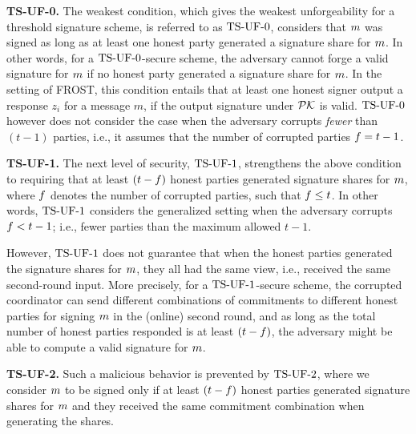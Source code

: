 
\medskip

\textbf{TS-UF-0.} The weakest condition,
which gives the weakest unforgeability for a threshold signature scheme,
is referred to as $\mathrm{TS}\mbox{-}\mathrm{UF}\mbox{-}{0}$, considers that $m$ was signed as long as at least one honest party generated a signature share for $m$.
In other words, for a $\mathrm{TS}\mbox{-}\mathrm{UF}\mbox{-}{0}$-secure scheme, the adversary cannot forge a valid signature for $m$ if no honest party generated a signature share for $m$.
In the setting of FROST,
this condition entails that at least one honest signer output a response $z_i$ for a message $m$,
if the output signature under $\mathcal{PK}$ is valid.
$\mathrm{TS}\mbox{-}\mathrm{UF}\mbox{-}{0}$ however does not consider the case when the adversary corrupts \emph{fewer} than $(t-1)$ parties,
i.e., it assumes that the number of corrupted parties $f = t-1$.

\medskip

\textbf{TS-UF-1.} The next level of security, $\mathrm{TS}\mbox{-}\mathrm{UF}\mbox{-}{1}$, strengthens the above condition to requiring that at least  $(t - f)$ honest parties generated signature shares for $m$,
where $f$ denotes the number of corrupted parties,
such that $f \leq t$.
In other words,
$\mathrm{TS}\mbox{-}\mathrm{UF}\mbox{-}{1}$ considers the generalized setting when the adversary corrupts $f < t-1$;
i.e., fewer parties than the maximum allowed $t-1$.

However, $\mathrm{TS}\mbox{-}\mathrm{UF}\mbox{-}{1}$ does not guarantee that when the honest parties generated the signature shares for $m$, they all had the same view, i.e., received the same second-round input.
More precisely, for a $\mathrm{TS}\mbox{-}\mathrm{UF}\mbox{-}{1}$-secure scheme, the corrupted coordinator can send different combinations of commitments to different honest parties for signing $m$ in the (online) second round,
and as long as the total number of honest parties responded is at least $(t-f)$, the adversary might be able to compute a valid signature for $m$.


\medskip

\textbf{TS-UF-2.}
Such a malicious behavior is prevented by $\mathrm{TS}\mbox{-}\mathrm{UF}\mbox{-}{2}$, where
we consider $m$ to be signed only if at least $(t - f)$ honest parties generated signature shares for $m$ and they received the same commitment combination when generating the shares.

